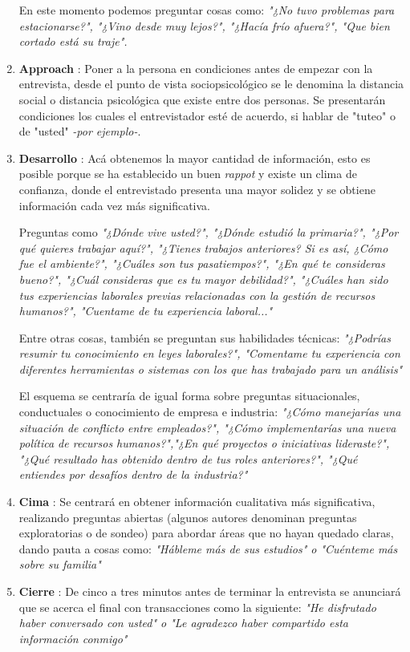 \documentclass[letterpaper,12pt]{article}
\begin{document}
\begin{sloppypar}
\begin{enumerate}
    En este momento podemos preguntar cosas como: \textit{"¿No tuvo problemas para estacionarse?", "¿Vino desde muy lejos?", "¿Hacía frío afuera?", "Que bien cortado está su traje".} 
    \item \textbf{Approach} : Poner a la persona en condiciones antes de empezar con la entrevista, desde el punto de vista sociopsicológico se le denomina la distancia social o distancia psicológica que existe entre dos personas. Se presentarán condiciones los cuales el entrevistador esté de acuerdo, si hablar de "tuteo" o de "usted" \textit{-por ejemplo-}. 
    \item \textbf{Desarrollo} : Acá obtenemos la mayor cantidad de información, esto es posible porque se ha establecido un buen \textit{rappot} y existe un clima de confianza, donde el entrevistado presenta una mayor solidez y se obtiene información cada vez más significativa.
    
    Preguntas como \textit{"¿Dónde vive usted?", "¿Dónde estudió la primaria?", "¿Por qué quieres trabajar aquí?", "¿Tienes trabajos anteriores? Si es así, ¿Cómo fue el ambiente?", "¿Cuáles son tus pasatiempos?", "¿En qué te consideras bueno?", "¿Cuál consideras que es tu mayor debilidad?", "¿Cuáles han sido tus experiencias laborales previas relacionadas con la gestión de recursos humanos?", "Cuentame de tu experiencia laboral..."}

    Entre otras cosas, también se preguntan sus habilidades técnicas: \textit{"¿Podrías resumir tu conocimiento en leyes laborales?", "Comentame tu experiencia con diferentes herramientas o sistemas con los que has trabajado para un análisis"}

    El esquema se centraría de igual forma sobre preguntas situacionales, conductuales o conocimiento de empresa e industria: \textit{"¿Cómo manejarías una situación de conflicto entre empleados?", "¿Cómo implementarías una nueva política de recursos humanos?","¿En qué proyectos o iniciativas lideraste?", "¿Qué resultado has obtenido dentro de tus roles anteriores?", "¿Qué entiendes por desafíos dentro de la industria?"}
    \item \textbf{Cima} : Se centrará en obtener información cualitativa más significativa, realizando preguntas abiertas (algunos autores denominan preguntas exploratorias o de sondeo) para abordar áreas que no hayan quedado claras, dando pauta a cosas como: \textit{"Hábleme más de sus estudios" o "Cuénteme más sobre su familia"}
    \item \textbf{Cierre} : De cinco a tres minutos antes de terminar la entrevista se anunciará que se acerca el final con transacciones como la siguiente: \textit{"He disfrutado haber conversado con usted" o "Le agradezco haber compartido esta información conmigo"}
\end{enumerate}


\end{sloppypar}
\end{document}
